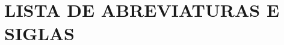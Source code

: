 \chapter*{LISTA DE ABREVIATURAS E SIGLAS}
\begin{acronym}[]
    
\end{acronym}
\thispagestyle{empty}